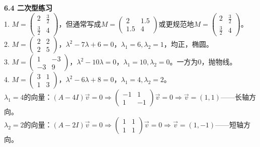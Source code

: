 \documentclass[a4paper,12pt]{ctexart}
\begin{document}
\noindent\textbf{6.4 二次型练习}\\
1. $M=\begin{pmatrix}2&\frac32\\\frac32&4\end{pmatrix}$，但通常写成$M=\begin{pmatrix}2&1.5\\1.5&4\end{pmatrix}$或更规范地$M=\begin{pmatrix}2&\frac32\\\frac32&4\end{pmatrix}$。\\
2. $M=\begin{pmatrix}2&2\\2&5\end{pmatrix}$，$\lambda^2-7\lambda+6=0$，$\lambda_1=6,\lambda_2=1$，均正，椭圆。\\
3. $M=\begin{pmatrix}1&-3\\-3&9\end{pmatrix}$，$\lambda^2-10\lambda=0$，$\lambda_1=10,\lambda_2=0$。一方为$0$，抛物线。\\
4. $M=\begin{pmatrix}3&1\\1&3\end{pmatrix}$，$\lambda^2-6\lambda+8=0$，$\lambda_1=4,\lambda_2=2$。\\
$\lambda_1=4$的向量：$(A-4I)\vec v=0\Rightarrow\begin{pmatrix}-1&1\\1&-1\end{pmatrix}\vec v=0\Rightarrow\vec v=(1,1)$——长轴方向。\\
$\lambda_2=2$的向量：$(A-2I)\vec v=0\Rightarrow\begin{pmatrix}1&1\\1&1\end{pmatrix}\vec v=0\Rightarrow\vec v=(1,-1)$——短轴方向。
\end{document}
